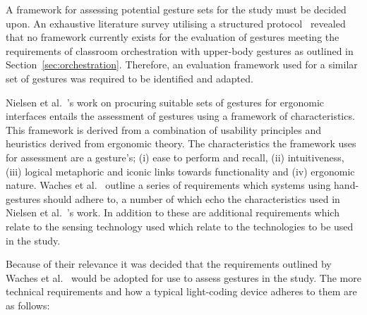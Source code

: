\documentclass[link]{IWCOMP}
\begin{document}
A framework for assessing potential gesture sets for the study must be decided upon.
An exhaustive literature survey utilising a structured protocol~\cite{kitchenham04} revealed that no framework currently exists for the evaluation of gestures meeting the requirements of classroom orchestration with upper-body gestures as outlined in Section~\ref{sec:orchestration}.
Therefore, an evaluation framework used for a similar set of gestures was required to be identified and adapted.

Nielsen et al.~\citeyearpar{Nielsen2004}'s work on procuring suitable sets of gestures for ergonomic interfaces entails the assessment of gestures using a framework of characteristics.
This framework is derived from a combination of usability principles and heuristics derived from ergonomic theory.
The characteristics the framework uses for assessment are a gesture's; (i) ease to perform and recall, (ii) intuitiveness, (iii) logical metaphoric and iconic links towards functionality and (iv) ergonomic nature.
Waches et al.~\citeyearpar{Wachs2011} outline a series of requirements which systems using hand-gestures should adhere to, a number of which echo the characteristics used in Nielsen et al.~\citeyearpar{Nielsen2004}'s work.
In addition to these are additional requirements which relate to the sensing technology used which relate to the technologies to be used in the study.

Because of their relevance it was decided that the requirements outlined by Waches et al.~\citeyearpar{Wachs2011} would be adopted for use to assess gestures in the study.
The more technical requirements and how a typical light-coding device adheres to them are as follows:
\end{document}
